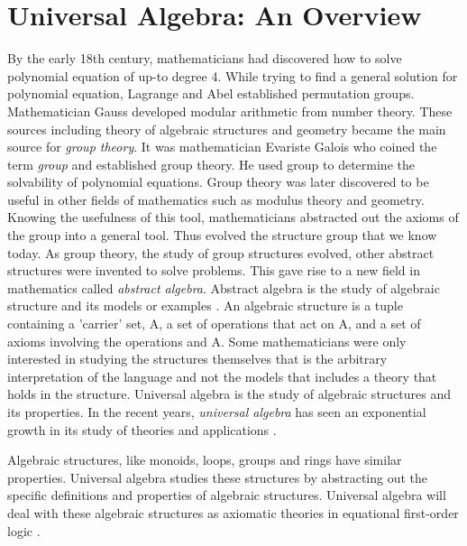 \chapter{Universal Algebra: An Overview}
By the early 18th century, mathematicians had discovered how to solve polynomial
equation of up-to degree 4. While trying to find a general solution for
polynomial equation, Lagrange and Abel established permutation groups.
Mathematician Gauss developed modular arithmetic from number theory. These
sources including theory of algebraic structures and geometry became the main
source for \textit{group theory}. It was mathematician Evariste Galois who
coined the term \emph{group} and established group theory. He used group to
determine the solvability of polynomial equations. Group theory was later
discovered to be useful in other fields of mathematics such as modulus theory
and geometry\cite{enwiki:1107380309}. Knowing the usefulness of this tool,
mathematicians abstracted out the axioms of the group into a general tool. Thus
evolved the structure group that we know today. As group theory, the study of
group structures evolved, other abstract structures were invented to solve
problems. This gave rise to a new field in mathematics called \emph{abstract
algebra}. Abstract algebra is the study of algebraic structure and its models or
examples \cite{enwiki:1107380309}. An algebraic structure is a tuple containing
a 'carrier' set, A, a set of operations that act on A, and a set of axioms
involving the operations and A. Some mathematicians were only interested in
studying the structures themselves that is the arbitrary interpretation of the
language and not the models that includes a theory that holds in the structure.
Universal algebra is the study of algebraic structures and its properties. In
the recent years, \emph{universal algebra} has seen an exponential growth in its
study of theories and applications \cite{sankappanavar1981course}. 

Algebraic structures, like monoids, loops, groups and rings have similar
properties. Universal algebra studies these structures by abstracting out the
specific definitions and properties of algebraic structures. Universal algebra
will deal with these algebraic structures as axiomatic theories in equational
first-order logic \cite{YSharoda}.

